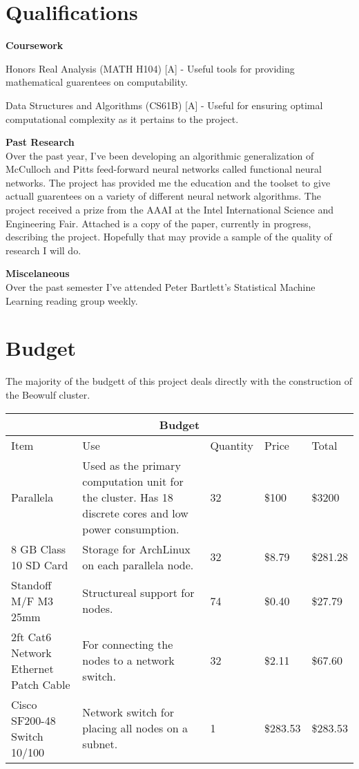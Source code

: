 \documentclass[letter]{article}
\newenvironment{menumerate}{%
  \edef\backupindent{\the\parindent}%
  \enumerate%
  \setlength{\parindent}{\backupindent}%
}{\endenumerate}
\begin{document}
\section{Qualifications}
\textbf{Coursework}
\begin{menumerate}
\item Honors Real Analysis (MATH H104) [A] - Useful tools for providing mathematical guarentees on computability.
\item Data Structures and Algorithms (CS61B) [A] - Useful for ensuring optimal computational complexity as it pertains to the project.
\end{menumerate}


\textbf{Past Research} \\
Over the past year, I've been developing an algorithmic generalization of McCulloch and Pitts feed-forward neural networks
called functional neural networks. The project has provided me the education and the toolset to give actuall guarentees on 
a variety of different neural network algorithms. The project received a prize from the AAAI at the Intel International Science and Engineering Fair.
Attached is a copy of the paper, currently in progress, describing the project. Hopefully that may provide a sample of the quality
of research I will do.

\textbf{Miscelaneous} \\
Over the past semester I've attended Peter Bartlett's Statistical Machine Learning reading group weekly.


\section{Budget}
The majority of the budgett of this project deals directly with the construction of the Beowulf cluster.


\vspace{7mm}
\centering
\begin{tabular}{ |p{2cm}|p{6cm}|p{1.5cm}|p{1cm}| p{1.5cm}|
 }
 \hline
 \multicolumn{5}{|c|}{Budget} \\
 \hline
Item& Use& Quantity&Price & Total\\
 \hline
  Parallela & Used as the primary computation unit for the cluster.  Has 18 discrete cores and low power
  consumption.  & 32 & \$100  & \$3200\\
  \hline
  8 GB Class 10 SD Card & Storage for ArchLinux on each parallela node. &32 &\$8.79 &\$281.28 \\
    \hline
  Standoff M/F M3 25mm &Structureal support for nodes. &74 &\$0.40 &\$27.79 \\
    \hline
  2ft Cat6 Network Ethernet Patch Cable & For connecting the nodes to a network switch. &32 &\$2.11 &\$67.60 \\
   \hline
  Cisco SF200-48 Switch 10/100 & Network switch for placing all nodes on a subnet. &1 &\$283.53 &\$283.53 \\

 \hline
\end{tabular}
\end{document}
